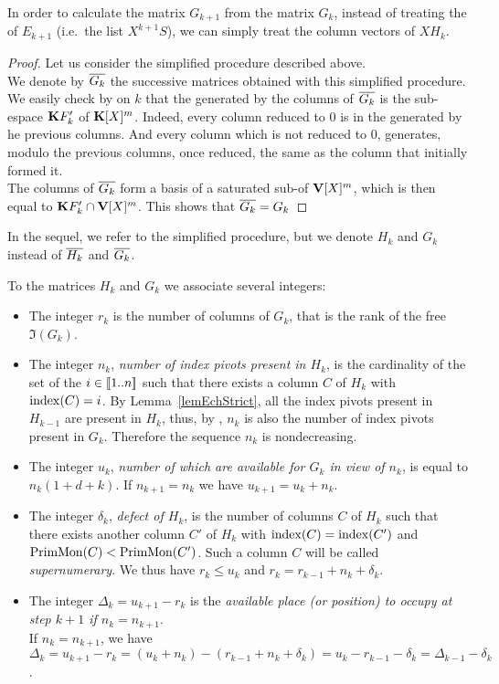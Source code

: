 \begin{fact} \label{factHksuffit}
In order to  calculate the  matrix $G_{k+1}$ from the matrix $G_k$, instead of treating the  \gtrs of $E_{k+1}$ (i.e.\ the list $X^{k+1}S$), we can simply treat the
column vectors of $XH_k$.
\end{fact}
%
\begin{proof}{}
Let us consider the simplified procedure described above. \\
We denote by $\overline{G_k}$ the successive matrices obtained with this  simplified procedure.
\\
We easily check by  \recu on $k$ that the \Kev generated by  the columns
of $\overline{G_k}$ is the  sub-espace $\mathbf{K} F'_k$ of $\mathbf{K}[X]^{m}$.
Indeed, every column reduced to $0$ is in the  \Kev generated by he previous columns. And every  column which is not reduced to  $0$, generates, modulo the previous columns, once reduced, the same \Kev as the
column that initially formed it.
\\
The columns of $\overline{G_k}$ form a basis of a saturated
sub-\Vmo of $\mathbf{V}[X]^{m}$, which is then equal to   $\mathbf{K} F'_k\cap\mathbf{V}[X]^{m}$. This shows that $\overline{G_k}=G_k$
\end{proof}
%

In the sequel, we refer to the simplified procedure, but we denote $H_k$ and $G_k$ instead of $\overline{H_k}$ and $\overline{G_k}$.


To the matrices $H_k$ and $G_k$ we associate several integers:
\begin{itemize}
%
\item The integer $r_k$ is the number of columns of $G_k$, that is the rank of the free \Vmo  $\Im(G_k)$.
%
\item The integer $n_k$, \textsl{number of index pivots  present in $H_k$}, is the cardinality of the set of the  $i\in[ \negthinspace [1..n] \negthinspace ]$ such that there exists a   column $C$ of $H_k$ with $\mathrm{index}(C)=i$.
By Lemma~\ref{lemEchStrict}, all the index pivots present
in $H_{k-1}$ are present in $H_k$, thus, by \recu,
 $n_k$ is also the number of index pivots present in $G_k$. Therefore the sequence  $n_k$ is nondecreasing.
%
\item The integer $u_k$, \textsl{number of  \coos which are available for  $G_k$ in view of $n_k$}, is equal to  $n_k(1+d+k)$. If $n_{k+1}=n_k$
we have $u_{k+1}=u_k+n_k$.
%
\item The integer $\delta_k$, \textsl{defect of $H_k$}, is the number of  columns $C$
of $H_k$ such that there exists another column  $C'$ of $H_k$
with $\mathrm{index}(C)=\mathrm{index}(C')$
and $\mathrm{PrimMon}(C)<\mathrm{PrimMon}(C')$. Such a column $C$ will be called \textsl{supernumerary}.  We thus have $r_k\leq u_k$ and $r_k=r_{k-1}+n_k+\delta_k$.
%
\item The integer $\Delta_k=u_{k+1}-r_k$ is the \textsl{available place (or position) to occupy at step $k+1$
if $n_k=n_{k+1}$}.\\ If $n_k=n_{k+1}$, we have $\Delta_k=u_{k+1}-r_k=(u_k+n_k)-(r_{k-1}+n_k+\delta_k)=u_k-r_{k-1}-\delta_k=\Delta_{k-1}-\delta_k$.
\end{itemize}

